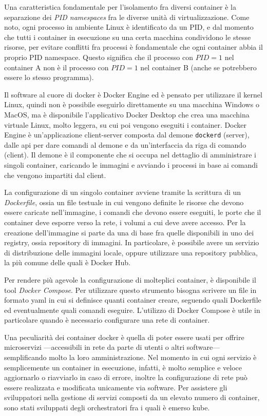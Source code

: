 \documentclass[12pt,a4paper,fleqn,titlepage]{report}
\begin{document}
        Una caratteristica fondamentale per l'isolamento fra diversi \gls{container} è la separazione dei \emph{PID namespaces} fra le diverse unità di virtualizzazione. Come noto, ogni processo in ambiente Linux è identificato da un PID, e dal momento che tutti i \gls{container} in esecuzione su una certa macchina condividono le stesse risorse, per evitare conflitti fra processi è fondamentale che ogni \gls{container} abbia il proprio PID namespace. Questo significa che il processo con $PID=1$ nel \gls{container} A non è il processo con $PID=1$ nel \gls{container} B (anche se potrebbero essere lo stesso programma).

        Il software al cuore di \gls{docker} è Docker Engine ed è pensato per utilizzare il kernel Linux, quindi non è possibile eseguirlo direttamente su una macchina Windows o MacOS, ma è disponibile l'applicativo Docker Desktop che crea una macchina virtuale Linux, molto leggera, su cui poi vengono eseguiti i \gls{container}. Docker Engine è un'applicazione client-server composta dal demone \lstinline{dockerd} (server), dalle \gls{api} per dare comandi al demone e da un'interfaccia da riga di comando (client). Il demone è il componente che si occupa nel dettaglio di amministrare i singoli \gls{container}, caricando le immagini e avviando i processi in base ai comandi che vengono impartiti dal client.

        La configurazione di un singolo \gls{container} avviene tramite la scrittura di un \emph{Dockerfile}, ossia un file testuale in cui vengono definite le risorse che devono essere caricate nell'immagine, i comandi che devono essere eseguiti, le porte che il \gls{container} deve esporre verso la rete, i volumi a cui deve avere accesso. Per la creazione dell'immagine si parte da una di base fra quelle disponibili in uno dei registry, ossia repository di immagini. In particolare, è possibile avere un servizio di distribuzione delle immagini locale, oppure utilizzare una repository pubblica, la più comune delle quali è Docker Hub.

        Per rendere più agevole la configurazione di molteplici \gls{container}, è disponibile il tool \emph{Docker Compose}. Per utilizzare questo strumento bisogna scrivere un file in formato \gls{yaml} in cui si definisce quanti \gls{container} creare, seguendo quali Dockerfile ed eventualmente quali comandi eseguire. L'utilizzo di Docker Compose è utile in particolare quando è necessario configurare una rete di \gls{container}.

        Una peculiarità dei \gls{container} \gls{docker} è quella di poter essere usati per offrire microservizi —accessibili in rete da parte di utenti o altri software— semplificando molto la loro amministrazione. Nel momento in cui ogni servizio è semplicemente un \gls{container} in esecuzione, infatti, è molto semplice e veloce aggiornarlo o riavviarlo in caso di errore, inoltre la configurazione di rete può essere realizzata e modificata unicamente via software. Per assistere gli sviluppatori nella gestione di servizi composti da un elevato numero di \gls{container}, sono stati sviluppati degli orchestratori \cite{burns:2016} fra i quali è emerso \gls{kube}.
\end{document}

